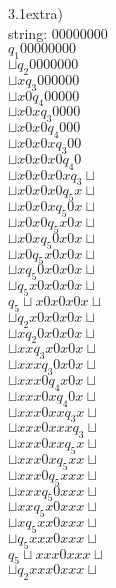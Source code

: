 \documentclass[11pt]{article}
\begin{document}
\noindent3.1extra)\\
string: 00000000\\
$q_1 00000000$\\
$\sqcup q_2 0000000$\\
$\sqcup x q_3 000000$\\
$\sqcup x 0 q_4 00000$\\
$\sqcup x 0 x q_3 0000$\\
$\sqcup x 0 x 0 q_4 000$\\
$\sqcup x 0 x 0 x q_3 00$\\
$\sqcup x 0 x 0 x 0 q_4 0$\\
$\sqcup x 0 x 0 x 0 x q_3 \sqcup$\\
$\sqcup x 0 x 0 x 0 q_5 x \sqcup$\\
$\sqcup x 0 x 0 x q_5 0 x \sqcup$\\
$\sqcup x 0 x 0 q_5 x 0 x \sqcup$\\
$\sqcup x 0 x q_5 0 x 0 x \sqcup$\\
$\sqcup x 0 q_5 x 0 x 0 x \sqcup$\\
$\sqcup x q_5 0 x 0 x 0 x \sqcup$\\
$\sqcup q_5 x 0 x 0 x 0 x \sqcup$\\
$q_5 \sqcup x 0 x 0 x 0 x \sqcup$\\
$\sqcup q_2 x 0 x 0 x 0 x \sqcup$\\
$\sqcup x q_2 0 x 0 x 0 x \sqcup$\\
$\sqcup x x q_3 x 0 x 0 x \sqcup$\\
$\sqcup x x x q_3 0 x 0 x \sqcup$\\
$\sqcup x x x 0 q_4 x 0 x \sqcup$\\
$\sqcup x x x 0 x q_4 0 x \sqcup$\\
$\sqcup x x x 0 x x q_3 x \sqcup$\\
$\sqcup x x x 0 x x x q_3 \sqcup$\\
$\sqcup x x x 0 x x q_5 x \sqcup$\\
$\sqcup x x x 0 x q_5 x x \sqcup$\\
$\sqcup x x x 0 q_5 x x x \sqcup$\\
$\sqcup x x x q_5 0 x x x \sqcup$\\
$\sqcup x x q_5 x 0 x x x \sqcup$\\
$\sqcup x q_5 x x 0 x x x \sqcup$\\
$\sqcup q_5 x x x 0 x x x \sqcup$\\
$q_5 \sqcup x x x 0 x x x \sqcup$\\
$\sqcup q_2 x x x 0 x x x \sqcup$\\
\end{document}
